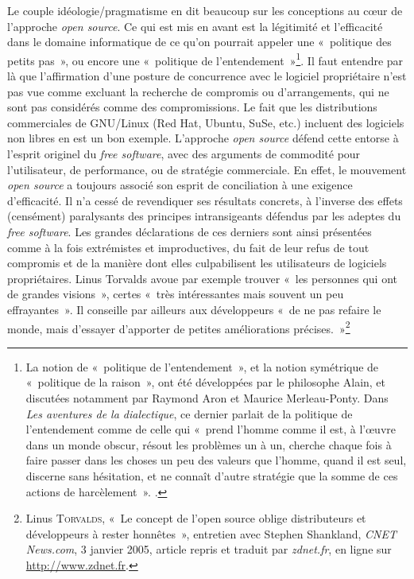 \documentclass{FramateX}
\begin{document}
\begin{refsection}
Le couple idéologie/pragmatisme en dit beaucoup sur les conceptions au
cœur de l'approche \textit{open source}. Ce qui est mis en avant est la
légitimité et l'efficacité dans le domaine informatique de ce qu'on
pourrait appeler une «~politique des petits pas~», ou encore une
«~politique de l'entendement~»\footnote{La notion de «~politique de
l'entendement~», et la notion symétrique de «~politique de la raison~»,
ont été développées par le philosophe Alain, et discutées notamment par
Raymond Aron et Maurice Merleau-Ponty. Dans \textit{Les aventures de la
dialectique}, ce dernier parlait de la politique de l'entendement comme
de celle qui «~prend l'homme comme il est, à l'œuvre dans un monde
obscur, résout les problèmes un à un, cherche chaque fois à faire
passer dans les choses un peu des valeurs que l'homme, quand il est
seul, discerne sans hésitation, et ne connaît d'autre stratégie que la
somme de ces actions de harcèlement~». \cite[p.~10]{merleau-pontyles1955}.}. Il faut entendre par là que l'affirmation d'une posture de
concurrence avec le logiciel propriétaire n'est pas vue comme excluant
la recherche de compromis ou d'arrangements, qui ne sont pas considérés
comme des compromissions. Le fait que les distributions commerciales de
GNU/Linux (Red Hat, Ubuntu, SuSe, etc.) incluent des logiciels non
libres en est un bon exemple. L'approche \textit{open source} défend cette entorse à l'esprit originel du \textit{free software}, avec des
arguments de commodité pour l'utilisateur, de performance, ou de
stratégie commerciale. En effet, le mouvement \textit{open source} a
toujours associé son esprit de conciliation à une exigence
d'efficacité. Il n'a cessé de
revendiquer ses résultats concrets, à l'inverse des effets (censément)
paralysants des principes intransigeants défendus par les adeptes du
\textit{free software}. Les grandes déclarations de ces derniers sont
ainsi présentées comme à la fois extrémistes et improductives, du fait
de leur refus de tout compromis et de la manière dont elles
culpabilisent les utilisateurs de logiciels propriétaires. Linus
Torvalds avoue par exemple trouver «~les personnes qui ont de grandes
visions~», certes «~très intéressantes mais souvent un peu
effrayantes~». Il conseille par ailleurs aux développeurs «~de ne pas refaire le monde, mais d'essayer d'apporter de petites améliorations précises.~»\footnote{Linus \textsc{Torvalds}, «~Le concept de l'open source oblige distributeurs et développeurs à rester honnêtes~», entretien
avec Stephen Shankland, \textit{CNET News.com}, 3 janvier 2005, article
repris et traduit par \textit{zdnet.fr}, en ligne sur \url{http://www.zdnet.fr}.}


\end{refsection}
\end{document}
